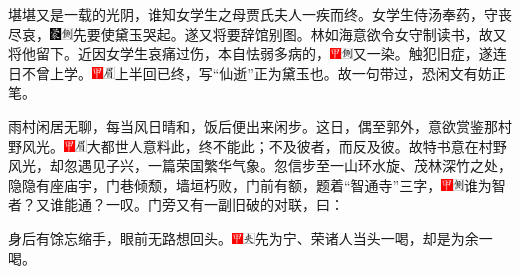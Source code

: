 堪堪又是一载的光阴，谁知女学生之母贾氏夫人一疾而终。女学生侍汤奉药，守丧尽哀，{\includegraphics[width=3mm]{../Images/00006}\includegraphics[width=3mm]{../Images/00011}\footnotesize \kaishu 先要使黛玉哭起。}遂又将要辞馆别图。林如海意欲令女守制读书，故又将他留下。近因女学生哀痛过伤，本自怯弱多病的，{\includegraphics[width=3mm]{../Images/00002}\includegraphics[width=3mm]{../Images/00011}\footnotesize \kaishu 又一染。}触犯旧症，遂连日不曾上学。{\includegraphics[width=3mm]{../Images/00002}\includegraphics[width=3mm]{../Images/00010}\footnotesize \kaishu 上半回已终，写``仙逝''正为黛玉也。故一句带过，恐闲文有妨正笔。}

雨村闲居无聊，每当风日晴和，饭后便出来闲步。这日，偶至郭外，意欲赏鉴那村野风光。{\includegraphics[width=3mm]{../Images/00002}\includegraphics[width=3mm]{../Images/00010}\footnotesize \kaishu 大都世人意料此，终不能此；不及彼者，而反及彼。故特书意在村野风光，却忽遇见子兴，一篇荣国繁华气象。}忽信步至一山环水旋、茂林深竹之处，隐隐有座庙宇，门巷倾颓，墙垣朽败，门前有额，题着``智通寺''三字，{\includegraphics[width=3mm]{../Images/00002}\includegraphics[width=3mm]{../Images/00011}\footnotesize \kaishu 谁为智者？又谁能通？一叹。}门旁又有一副旧破的对联，曰：

身后有馀忘缩手，眼前无路想回头。{\includegraphics[width=3mm]{../Images/00002}\includegraphics[width=3mm]{../Images/00012}\footnotesize \kaishu 先为宁、荣诸人当头一喝，却是为余一喝。}

